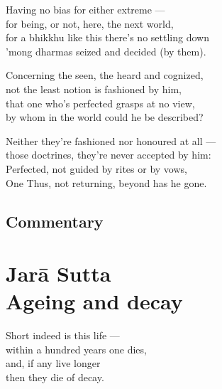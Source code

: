 \begin{MyDescription}{}
Having no bias for either extreme —\\
for being, or not, here, the next world,\\
for a bhikkhu like this there's no settling down\\
'mong dharmas seized and decided (by them).
\end{MyDescription}

\begin{MyDescription}{}
Concerning the seen, the heard and cognized,\\
not the least notion is fashioned by him,\\
that one who's perfected grasps at no view,\\
by whom in the world could he be described?
\end{MyDescription}

\begin{MyDescription}{}
Neither they're fashioned nor honoured at all —\\
those doctrines, they're never accepted by him:\\
Perfected, not guided by rites or by vows,\\
One Thus, not returning, beyond has he gone.
\end{MyDescription}

\begin{MyDescription}[(Sn. 796-803)]{}

\end{MyDescription}

   

\section{Commentary}

\chapter{Jar\=a Sutta\\ Ageing and decay}

\begin{MyDescription}{}
Short indeed is this life —\\
within a hundred years one dies,\\	
and, if any live longer\\
then they die of decay.
\end{MyDescription}

